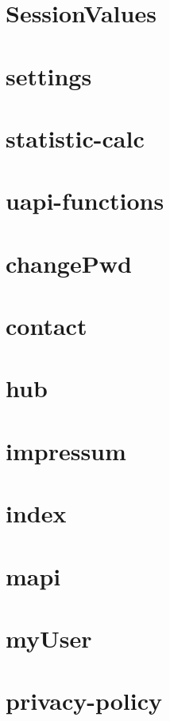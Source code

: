 \section{SessionValues}

\newpage
\section{settings}

\newpage
\section{statistic-calc}

\newpage
\section{uapi-functions}

\newpage
\section{changePwd}

\newpage
\section{contact}

\newpage
\section{hub}

\newpage
\section{impressum}

\newpage
\section{index}

\newpage
\section{mapi}

\newpage
\section{myUser}

\newpage
\section{privacy-policy}

\newpage
